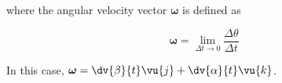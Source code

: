 \documentclass[a4paper,12pt]{report}
\begin{document}
\begin{appendices}
where the angular velocity vector \(\boldsymbol{\omega } \) is defined as 

\begin{equation}
	\boldsymbol{\omega } = \lim_{\Delta t\to 0} \frac{\Delta \theta }{\Delta t} 
\end{equation}

In this case, \(\boldsymbol{\omega } = \dv{\beta }{t} \vu{j} + \dv{\alpha }{t} \vu{k} \). 




















































\end{appendices}
\end{document}

